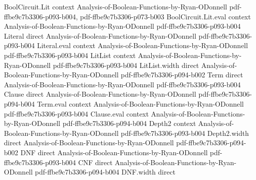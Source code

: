 \begin{theorem}
\leanok
{}
\proofstep
  {BoolCircuit.Lit}
  {context}
  {Analysis-of-Boolean-Functions-by-Ryan-ODonnell}
  {pdf-ffbe9c7b3306-p093-b004,
    pdf-ffbe9c7b3306-p073-b003}
\proofstep
  {BoolCircuit.Lit.eval}
  {context}
  {Analysis-of-Boolean-Functions-by-Ryan-ODonnell}
  {pdf-ffbe9c7b3306-p093-b004}
\proofstep
  {Literal}
  {direct}
  {Analysis-of-Boolean-Functions-by-Ryan-ODonnell}
  {pdf-ffbe9c7b3306-p093-b004}
\proofstep
  {Literal.eval}
  {context}
  {Analysis-of-Boolean-Functions-by-Ryan-ODonnell}
  {pdf-ffbe9c7b3306-p093-b004}
\proofstep
  {LitList}
  {context}
  {Analysis-of-Boolean-Functions-by-Ryan-ODonnell}
  {pdf-ffbe9c7b3306-p093-b004}
\proofstep
  {LitList.width}
  {direct}
  {Analysis-of-Boolean-Functions-by-Ryan-ODonnell}
  {pdf-ffbe9c7b3306-p094-b002}
\proofstep
  {Term}
  {direct}
  {Analysis-of-Boolean-Functions-by-Ryan-ODonnell}
  {pdf-ffbe9c7b3306-p093-b004}
\proofstep
  {Clause}
  {direct}
  {Analysis-of-Boolean-Functions-by-Ryan-ODonnell}
  {pdf-ffbe9c7b3306-p094-b004}
\proofstep
  {Term.eval}
  {context}
  {Analysis-of-Boolean-Functions-by-Ryan-ODonnell}
  {pdf-ffbe9c7b3306-p093-b004}
\proofstep
  {Clause.eval}
  {context}
  {Analysis-of-Boolean-Functions-by-Ryan-ODonnell}
  {pdf-ffbe9c7b3306-p094-b004}
\proofstep
  {Depth2}
  {context}
  {Analysis-of-Boolean-Functions-by-Ryan-ODonnell}
  {pdf-ffbe9c7b3306-p093-b004}
\proofstep
  {Depth2.width}
  {direct}
  {Analysis-of-Boolean-Functions-by-Ryan-ODonnell}
  {pdf-ffbe9c7b3306-p094-b002}
\proofstep
  {DNF}
  {direct}
  {Analysis-of-Boolean-Functions-by-Ryan-ODonnell}
  {pdf-ffbe9c7b3306-p093-b004}
\proofstep
  {CNF}
  {direct}
  {Analysis-of-Boolean-Functions-by-Ryan-ODonnell}
  {pdf-ffbe9c7b3306-p094-b004}
\proofstep
  {DNF.width}
  {direct}

\end{theorem}
